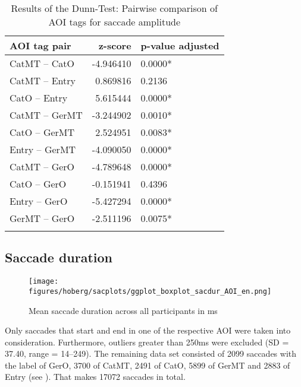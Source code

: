 \documentclass[output=paper,colorlinks,citecolor=brown]{langscibook}
\begin{document}
\begin{table}
\caption{Results of the Dunn-Test: Pairwise comparison of AOI tags for saccade amplitude}
\label{tab:dunntest-sacamp}
 \begin{tabularx}{\textwidth}{XrY}
  \lsptoprule
             AOI tag pair & z-score & p-value adjusted \\
  \midrule
 CatMT -- CatO  & -4.946410 & 0.0000*\\
 CatMT -- Entry &  0.869816 & 0.2136\\
 CatO -- Entry  &  5.615444 & 0.0000*\\
 CatMT -- GerMT & -3.244902 & 0.0010*\\
 CatO -- GerMT  &  2.524951 & 0.0083*\\
 Entry -- GerMT & -4.090050 & 0.0000*\\
 CatMT -- GerO  & -4.789648 & 0.0000*\\
 CatO -- GerO   & -0.151941 & 0.4396\\
 Entry -- GerO  & -5.427294 & 0.0000*\\
 GerMT -- GerO  & -2.511196 & 0.0075*\\
  \lspbottomrule
 \end{tabularx}
\end{table}


\subsection{Saccade duration}
\label{subsec:results:sacdur}

\begin{figure}
    \centering
    \texttt{[image: figures/hoberg/sacplots/ggplot\_boxplot\_sacdur\_AOI\_en.png]}
    \caption{Mean saccade duration across all participants in ms}
    \label{fig:sac-dur}
\end{figure}

Only saccades that start and end in one of the respective AOI were taken into consideration. Furthermore, outliers greater than 250ms were excluded (SD = 37.40, range = 14--249). The remaining data set consisted of 2099 saccades with the label of GerO, 3700 of CatMT, 2491 of CatO, 5899 of GerMT and 2883 of Entry (see ). That makes 17072 saccades in total.

\end{document}
